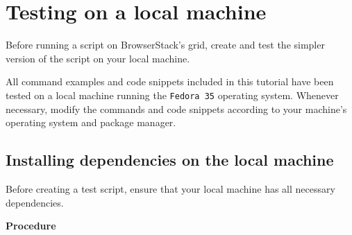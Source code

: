 \documentclass{article}
\begin{document}
\section*{Testing on a local machine}

Before running a script on BrowserStack's grid, create and test the simpler version of the script on your local machine.

\begin{tcolorbox}[colback=blue!5!white,colframe=blue!75!black,title=Note]
All command examples and code snippets included in this tutorial have been tested on a local machine running the \texttt{Fedora 35} operating system. Whenever necessary, modify the commands and code snippets according to your machine's operating system and package manager.
\end{tcolorbox}

\subsection*{Installing dependencies on the local machine}

Before creating a test script, ensure that your local machine has all necessary dependencies.

\textbf{Procedure}
\end{document}
